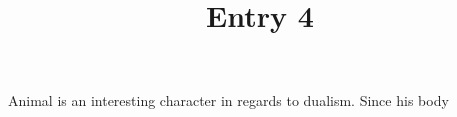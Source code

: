\documentclass{article}
\title{Entry 4}
\begin{document}
Animal is an interesting character in regards to dualism. Since his body 
\end{document}
